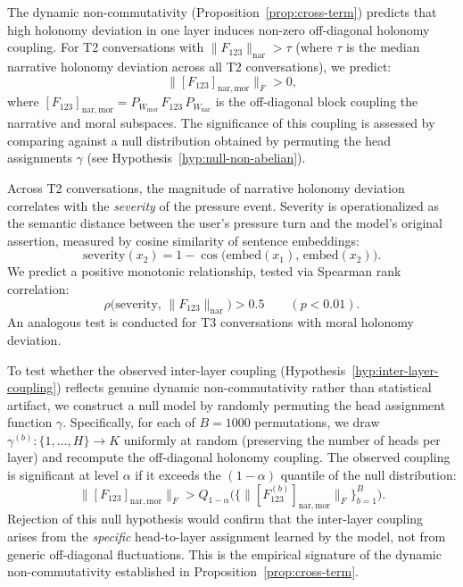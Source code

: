 \begin{hypothesis}
\label{hyp:inter-layer-coupling}
The dynamic non-commutativity (Proposition~\ref{prop:cross-term}) predicts that high holonomy deviation
in one layer induces non-zero off-diagonal holonomy coupling. For T2 conversations with
$\|F_{123}\|_{\mathrm{nar}} > \tau$ (where $\tau$ is the median narrative holonomy deviation across
all T2 conversations), we predict:
\[
    \big\|[F_{123}]_{\mathrm{nar},\mathrm{mor}}\big\|_F > 0,
\]
where $[F_{123}]_{\mathrm{nar},\mathrm{mor}} = P_{W_{\mathrm{mor}}}\, F_{123}\,
P_{W_{\mathrm{nar}}}$ is the off-diagonal block coupling the narrative and moral
subspaces. The significance of this coupling is assessed by comparing against a null
distribution obtained by permuting the head assignments $\gamma$ (see
Hypothesis~\ref{hyp:null-non-abelian}).
\end{hypothesis}

\begin{hypothesis}
\label{hyp:severity-correlation}
Across T2 conversations, the magnitude of narrative holonomy deviation correlates with the
\emph{severity} of the pressure event. Severity is operationalized as the semantic
distance between the user's pressure turn and the model's original assertion, measured by
cosine similarity of sentence embeddings:
\[
    \text{severity}(x_2) = 1 - \cos\!\big(\mathrm{embed}(x_1),\, \mathrm{embed}(x_2)\big).
\]
We predict a positive monotonic relationship, tested via Spearman rank correlation:
\[
    \rho\big(\text{severity},\, \|F_{123}\|_{\mathrm{nar}}\big) > 0.5
    \qquad (p < 0.01).
\]
An analogous test is conducted for T3 conversations with moral holonomy deviation.
\end{hypothesis}

\begin{hypothesis}
\label{hyp:null-non-abelian}
To test whether the observed inter-layer coupling (Hypothesis~\ref{hyp:inter-layer-coupling})
reflects genuine dynamic non-commutativity rather than statistical artifact, we construct a
null model by randomly permuting the head assignment function $\gamma$. Specifically, for
each of $B = 1000$ permutations, we draw $\gamma^{(b)} : \{1, \ldots, H\} \to K$ uniformly
at random (preserving the number of heads per layer) and recompute the off-diagonal
holonomy coupling. The observed coupling is significant at level $\alpha$ if it exceeds
the $(1 - \alpha)$ quantile of the null distribution:
\[
    \big\|[F_{123}]_{\mathrm{nar},\mathrm{mor}}\big\|_F >
    Q_{1-\alpha}\!\Big(\Big\{\big\|[F_{123}^{(b)}]_{\mathrm{nar},\mathrm{mor}}\big\|_F
    \Big\}_{b=1}^{B}\Big).
\]
Rejection of this null hypothesis would confirm that the inter-layer coupling arises from
the \emph{specific} head-to-layer assignment learned by the model, not from generic
off-diagonal fluctuations. This is the empirical signature of the dynamic non-commutativity
established in Proposition~\ref{prop:cross-term}.
\end{hypothesis}

